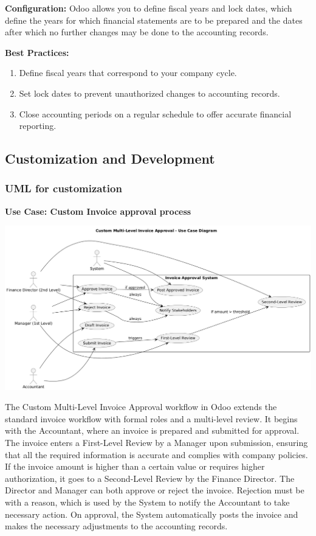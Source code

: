 \documentclass[11pt,a4paper]{article}
\begin{document}
\noindent\textbf{Configuration:} Odoo allows you to define fiscal years and lock dates, which define the years for which 
financial statements are to be prepared and the dates after which no further changes may be done 
to the accounting records.
\medskip

\noindent\textbf{Best Practices:}
\begin{enumerate}
    \item Define fiscal years that correspond to your company cycle.
    \item Set lock dates to prevent unauthorized changes to accounting records.
    \item Close accounting periods on a regular schedule to offer accurate financial reporting.
\end{enumerate}

\newpage
\subsection{Customization and Development}
\subsubsection{UML for customization}
\noindent\textbf{Use Case: Custom Invoice approval process}
\begin{center}
    \includegraphics[width=0.8\linewidth]{diagram/custom_multi_level.png}
\end{center}

\noindent The Custom Multi-Level Invoice Approval workflow in Odoo extends the standard invoice 
workflow with formal roles and a multi-level review. It begins with the Accountant, where an 
invoice is prepared and submitted for approval. The invoice enters a First-Level Review by a 
Manager upon submission, ensuring that all the required information is accurate and complies 
with company policies. If the invoice amount is higher than a certain value or requires higher 
authorization, it goes to a Second-Level Review by the Finance Director. The Director and 
Manager can both approve or reject the invoice. Rejection must be with a reason, which is used 
by the System to notify the Accountant to take necessary action. On approval, the System 
automatically posts the invoice and makes the necessary adjustments to the accounting records.
\medskip
\end{document}
